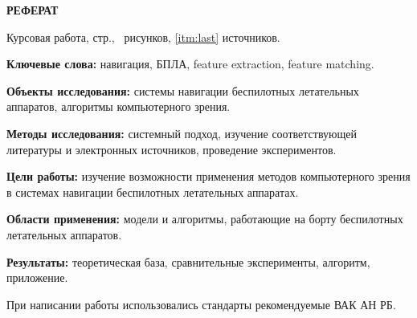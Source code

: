 \begin{center}
  \large\bfseries{РЕФЕРАТ}
\end{center}

Курсовая работа, \pageref{LastPage} стр., \totalfigures\ рисунков, \ref{itm:last} источников.

\begin{center}
  \Large{\@jobtitle}
\end{center}

\textbf{Ключевые слова:} навигация, БПЛА, feature extraction, feature matching.

\textbf{Объекты исследования:} системы навигации беспилотных летательных аппаратов, алгоритмы компьютерного зрения.

\textbf{Методы исследования:} системный подход, изучение соответствующей литературы и электронных источников, проведение экспериментов.

\textbf{Цели работы:} изучение возможности применения методов компьютерного зрения в системах навигации беспилотных летательных аппаратах.

\textbf{Области применения:} модели и алгоритмы, работающие на борту беспилотных летательных аппаратов.

\textbf{Результаты:} теоретическая база, сравнительные эксперименты, алгоритм, приложение. 

При написании работы использовались стандарты рекомендуемые ВАК АН РБ.

\newpage